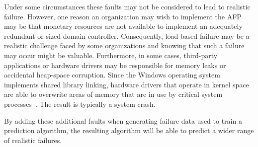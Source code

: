 Under some circumstances these faults may not be considered to lead to
realistic failure.  However, one reason an organization may wish to implement
the AFP may be that monetary resources are not available to implement an
adequately redundant or sized domain controller.  Consequently, load based
failure may be a realistic challenge faced by some organizations and knowing
that such a failure may occur might be valuable.  Furthermore, in some cases,
third-party applications or hardware drivers may be responsible for memory
leaks or accidental heap-space corruption.  Since the Windows operating system
implements shared library linking, hardware drivers that operate in kernel
space are able to overwrite areas of memory that are in use by critical system
processes~\cite{russinovich2009}.  The result is typically a system crash.

By adding these additional faults when generating failure data used to train a
prediction algorithm, the resulting algorithm will be able to predict a wider
range of realistic failures.  
